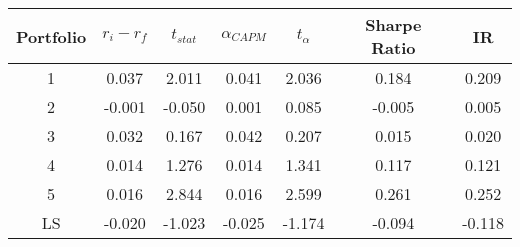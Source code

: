 \begin{tabular}{ccccccc}
\toprule
Portfolio &  $r_i - r_f$ &  $t_{stat}$ &  $\alpha_{CAPM}$ &  $t_{\alpha}$ &  Sharpe Ratio &     IR \\
\midrule
        1 &        0.037 &       2.011 &            0.041 &         2.036 &         0.184 &  0.209 \\
        2 &       -0.001 &      -0.050 &            0.001 &         0.085 &        -0.005 &  0.005 \\
        3 &        0.032 &       0.167 &            0.042 &         0.207 &         0.015 &  0.020 \\
        4 &        0.014 &       1.276 &            0.014 &         1.341 &         0.117 &  0.121 \\
        5 &        0.016 &       2.844 &            0.016 &         2.599 &         0.261 &  0.252 \\
       LS &       -0.020 &      -1.023 &           -0.025 &        -1.174 &        -0.094 & -0.118 \\
\bottomrule
\end{tabular}
